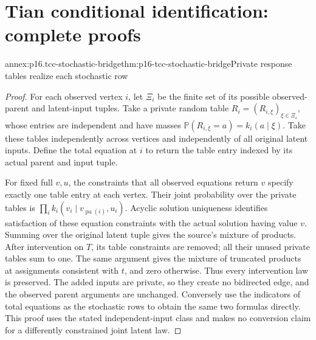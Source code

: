 \section{Tian conditional identification: complete proofs}
\label{sec:annex-p16-tian-conditional-identification}

\begin{annexitem}{annex:p16.tcc-stochastic-bridge}{thm:p16-tcc-stochastic-bridge}{Private response tables realize each stochastic row}
\begin{proof}
For each observed vertex \(i\), let \(\Xi_i\) be the finite
set of its possible observed-parent and latent-input tuples. Take
a private random table \(R_i=(R_{i,\xi})_{\xi\in\Xi_i}\),
whose entries are independent and have masses
\(\mathbb P(R_{i,\xi}=a)=k_i(a\mid\xi)\). Take these
tables independently across vertices and independently of all original
latent inputs. Define the total equation at \(i\) to return
the table entry indexed by its actual parent and input tuple.

For fixed full \(v,u\), the constraints that all observed
equations return \(v\) specify exactly one table entry at
each vertex. Their joint probability over the private tables is
\(\prod_i k_i(v_i\mid v_{\operatorname{pa}(i)},u_i)\).
Acyclic solution uniqueness identifies satisfaction of these equation
constraints with the actual solution having value \(v\).
Summing over the original latent tuple gives the source's mixture
of products. After intervention on \(T\), its table constraints
are removed; all their unused private tables sum to one. The
same argument gives the mixture of truncated products at assignments
consistent with \(t\), and zero otherwise. Thus every intervention
law is preserved. The added inputs are private, so they create
no bidirected edge, and the observed parent arguments are unchanged.
Conversely use the indicators of total equations as the stochastic
rows to obtain the same two formulas directly. This proof uses
the stated independent-input class and makes no conversion claim
for a differently constrained joint latent law.
\end{proof}
\end{annexitem}


